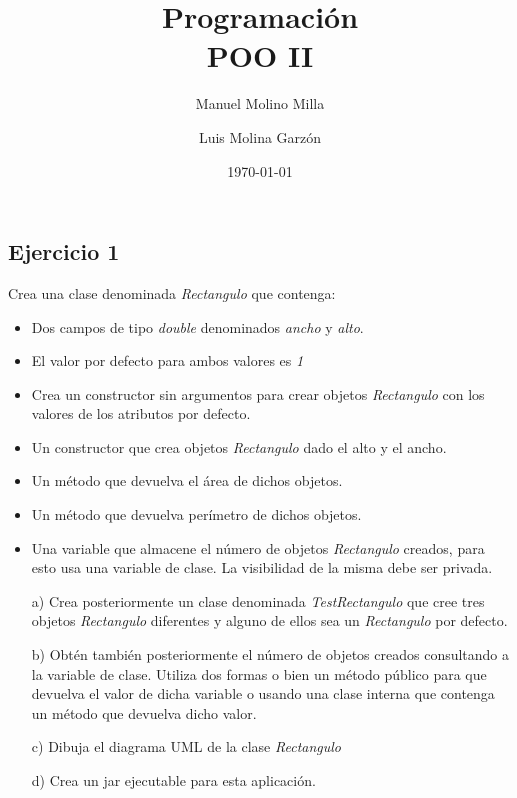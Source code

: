 \documentclass[4paper]{article}
\author{Manuel Molino Milla \and Luis Molina Garzón}
\title{\textbf{Programación}
\\POO II}
\date{\today}
\begin{document}
\maketitle

\subsection*{Ejercicio 1}
Crea una clase denominada \emph{Rectangulo} que contenga:
\begin{itemize}
\item Dos campos de tipo \emph{double} denominados \emph{ancho} y \emph{alto}.
\item El valor por defecto para ambos valores es \emph{1}
\item Crea un constructor sin argumentos para crear objetos \emph{Rectangulo} con los valores de los atributos por defecto.
\item Un constructor que crea objetos \emph{Rectangulo} dado el alto y el ancho.
\item Un método que devuelva el área de dichos objetos.
\item Un método que devuelva perímetro de dichos objetos.
\item Una variable que almacene el número de objetos \emph{Rectangulo} creados, para esto usa una variable de clase. La visibilidad de la misma debe ser privada.
\end{itemize}
\begin{enumerate}
\item[a)] Crea posteriormente un clase denominada \emph{TestRectangulo} que cree tres objetos \emph{Rectangulo} diferentes y alguno de ellos sea un \emph{Rectangulo} por defecto.
\item[b)] Obtén también posteriormente el número de objetos creados consultando a la variable de clase. Utiliza dos formas o bien un método público para que devuelva el valor de dicha variable o usando una clase interna que contenga un método que devuelva dicho valor.
\item[c)] Dibuja el diagrama UML de la clase \emph{Rectangulo}
\item[d)] Crea un jar ejecutable para esta aplicación.

\end{enumerate}
\end{document}
